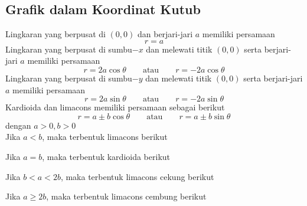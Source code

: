 \documentclass{article}
\begin{document}
\subsection{Grafik dalam Koordinat Kutub}
Lingkaran yang berpusat di $(0,0)$ dan berjari-jari $a$ memiliki persamaan
$$ r = a $$
Lingkaran yang berpusat di sumbu$-x$ dan melewati titik $(0,0)$ serta berjari-jari $a$ memiliki persamaan
$$ r=2a\cos\theta \qquad \text{atau} \qquad r=-2a\cos\theta $$
Lingkaran yang berpusat di sumbu$-y$ dan melewati titik $(0,0)$ serta berjari-jari $a$ memiliki persamaan
$$ r=2a\sin\theta \qquad \text{atau} \qquad r=-2a\sin\theta $$
Kardioida dan limacons memiliki persamaan sebagai berikut 
$$ r=a\pm b\cos\theta \qquad\text{atau}\qquad r=a\pm b \sin\theta $$
dengan $a>0,b>0$\\
Jika $a<b$, maka terbentuk limacons berikut
\begin{center}
	\end{center}
Jika $a=b$, maka terbentuk kardioida berikut
\begin{center}
	\end{center}
Jika $b<a<2b$, maka terbentuk limacons cekung berikut
\begin{center}
	\end{center}
Jika $a\geq 2b$, maka terbentuk limacons cembung berikut
\begin{center}
	\end{center} 
\end{document}
